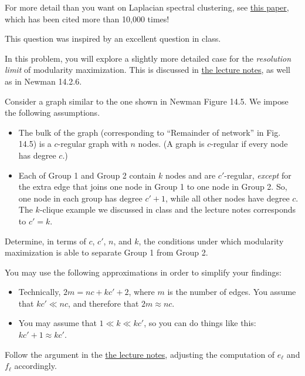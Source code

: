 \documentclass{hw}
\begin{document}
\begin{note}
    For more detail than you want on Laplacian spectral clustering, see \href{https://arxiv.org/abs/0711.0189}{this paper}, which has been cited more than 10,000 times! 
\end{note}

\problem{}

\begin{note}
    This question was inspired by an excellent question in class. 
\end{note}

In this problem, you will explore a slightly more detailed case for the \emph{resolution limit} of modularity maximization. 
This is discussed in \href{https://www.philchodrow.com/intro-networks/chapters/clustering_community.html#resolution-limit}{the lecture notes}, as well as in Newman 14.2.6. 

Consider a graph similar to the one shown in Newman Figure 14.5. 
We impose the following assumptions.  
\begin{itemize}
    \item The bulk of the graph (corresponding to ``Remainder of network'' in Fig. 14.5) is a $c$-regular graph with $n$ nodes. 
    (A graph is $c$-regular if every node has degree $c$.)  
    \item Each of Group 1 and Group 2 contain $k$ nodes and are $c'$-regular, \emph{except} for the extra edge that joins one node in Group 1 to one node in Group 2. 
    So, one node in each group has degree $c'+1$, while all other nodes have degree $c$. 
    The $k$-clique example we discussed in class and the lecture notes corresponds to $c' = k$. 
\end{itemize}
Determine, in terms of $c$, $c'$, $n$, and $k$, the conditions under which modularity maximization is able to separate Group 1 from Group 2. 

You may use the following approximations in order to simplify your findings: 
\begin{itemize}
    \item Technically, $2m = nc + kc' + 2$, where $m$ is the number of edges. You assume that $kc' \ll nc$, and therefore that $2m \approx nc$. 
    \item You may assume that $1 \ll k \ll kc'$, so you can do things like this: $kc' + 1 \approx kc'$. 
\end{itemize}



\begin{hint}
    Follow the argument in the \href{https://www.philchodrow.com/intro-networks/chapters/clustering_community.html#resolution-limit}{the lecture notes}, adjusting the computation of $e_\ell$ and $f_\ell$ accordingly. 
\end{hint}
\end{document}
